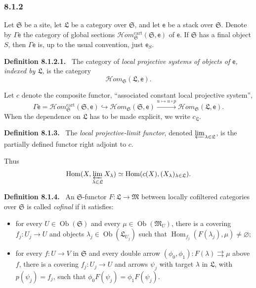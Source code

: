 \documentclass[11pt]{article}
\newcommand{\Hom}{\operatorname{Hom}}
\newcommand{\ob}{\operatorname{Ob}}
\newcommand{\Hhom}{\mathcal{H}om}
\newcommand{\Ss}{\mathfrak{S}}
\newcommand{\Ll}{\mathfrak{L}}
\newcommand{\Mm}{\mathfrak{M}}
\newenvironment{statement}[1]{\par\medskip\noindent\textbf{#1.}\ }{\par\medskip}
\begin{document}
\subsubsection*{8.1.2}
Let $\Ss$ be a site, let $\Ll$ be a category over $\Ss$, and let $\mathsf e$ be a stack over $\Ss$. Denote by $\Gamma\mathsf e$ the category of global sections $\Hhom_{\Ss}^{\mathrm{cart}}(\Ss,\mathsf e)$ of $\mathsf e$. If $\Ss$ has a final object $S$, then $\Gamma\mathsf e$ is, up to the usual convention, just $\mathsf e_S$.

\begin{statement}{Definition 8.1.2.1}
The category of \emph{local projective systems of objects of $\mathsf e$, indexed by $\Ll$}, is the category
\[
        \Hhom_{\Ss}(\Ll,\mathsf e).
\]
\end{statement}

Let $c$ denote the composite functor, ``associated constant local projective system'',
\[
\Gamma\mathsf e=\Hhom_{\Ss}^{\mathrm{cart}}(\Ss,\mathsf e)
\hookrightarrow \Hhom_{\Ss}(\Ss,\mathsf e)
\xrightarrow{u\mapsto u\circ p}\Hhom_{\Ss}(\Ll,\mathsf e).
\]
When the dependence on $\Ll$ has to be made explicit, we write $c_\Ll$.

\begin{statement}{Definition 8.1.3}
The \emph{local projective-limit functor}, denoted $\varprojlim_{\lambda\in\Ll}$, is the partially defined functor right adjoint to $c$.
\end{statement}

Thus
\[
        \Hom(X,\varprojlim_{\lambda\in\Ll}X_\lambda)
        \simeq
        \Hom(c(X),(X_\lambda)_{\lambda\in\Ll}).
\]

\begin{statement}{Definition 8.1.4}
An $\Ss$-functor $F:\Ll\to\Mm$ between locally cofiltered categories over $\Ss$ is called \emph{cofinal} if it satisfies:
\begin{itemize}
\item[($C\mathfrak F1$)] for every $U\in\ob(\Ss)$ and every $\mu\in\ob(\Mm_U)$, there is a covering $f_j:U_j\to U$ and objects $\lambda_j\in\ob(\Ll_{U_j})$ such that $\Hom_{f_j}(F(\lambda_j),\mu)\neq\varnothing$;
\item[($C\mathfrak F2$)] for every $f:U\to V$ in $\Ss$ and every double arrow $(\phi_0,
\phi_1):F(\lambda)\rightrightarrows\mu$ above $f$, there is a covering $f_j:U_j\to U$ and arrows $\psi_j$ with target $\lambda$ in $\Ll$, with $p(\psi_j)=f_j$, such that $\phi_0F(\psi_j)=\phi_1F(\psi_j)$.
\end{itemize}
\end{statement}
\end{document}
